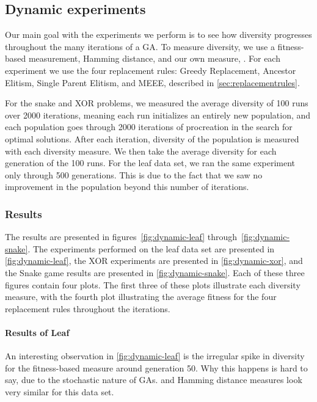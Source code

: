 \subsection{Dynamic experiments}\label{sec:continuousdiversity}
Our main goal with the experiments we perform is to see how diversity progresses throughout the many iterations of a GA. To measure diversity, we use a fitness-based measurement, Hamming distance, and our own measure, \dia. For each experiment we use the four replacement rules: Greedy Replacement, Ancestor Elitism, Single Parent Elitism, and MEEE, described in \cref{sec:replacementrules}.

For the snake and XOR problems, we measured the average diversity of \num{100} runs over \num{2000} iterations, meaning each run initializes an entirely new population, and each population goes through \num{2000} iterations of procreation in the search for optimal solutions. After each iteration, diversity of the population is measured with each diversity measure. We then take the average diversity for each generation of the \num{100} runs. For the leaf data set, we ran the same experiment only through \num{500} generations. This is due to the fact that we saw no improvement in the population beyond this number of iterations. 

\subsubsection{Results}
The results are presented in figures~\ref{fig:dynamic-leaf} through~\ref{fig:dynamic-snake}. The experiments performed on the leaf data set are presented in \cref{fig:dynamic-leaf}, the XOR experiments are presented in \cref{fig:dynamic-xor}, and the Snake game results are presented in \cref{fig:dynamic-snake}. Each of these three figures contain four plots. The first three of these plots illustrate each diversity measure, with the fourth plot illustrating the average fitness for the four replacement rules throughout the iterations. 

\paragraph{Results of Leaf} An interesting observation in \cref{fig:dynamic-leaf} is the irregular spike in diversity for the fitness-based measure around generation \num{50}. Why this happens is hard to say, due to the stochastic nature of GAs. \dia{} and Hamming distance measures look very similar for this data set. %

